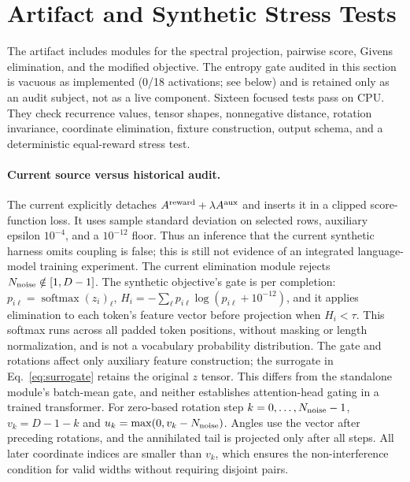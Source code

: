 \documentclass{article}
\begin{document}
\section{Artifact and Synthetic Stress Tests}
\label{sec:artifact}

The artifact includes modules for the spectral projection, pairwise score,
Givens elimination, and the modified objective. The entropy gate audited
in this section is vacuous as implemented (0/18 activations; see below)
and is retained only as an audit subject, not as a live component.
Sixteen focused tests pass on
CPU.  They check recurrence values, tensor shapes, nonnegative distance,
rotation invariance, coordinate elimination, fixture construction, output
schema, and a deterministic equal-reward stress test.

\paragraph{Current source versus historical audit.}
The current  explicitly
detaches $A^{\rm reward}+\lambda A^{\rm aux}$ and inserts it in a clipped
score-function loss. It uses sample standard deviation on selected rows,
auxiliary epsilon $10^{-4}$, and a $10^{-12}$ floor. Thus an inference
that the current synthetic harness omits coupling is false; this is still
not evidence of an integrated language-model training experiment. The current
elimination module rejects $N_{\rm noise}\notin[1,D-1]$.
The synthetic objective's gate is per completion:
$p_{i\ell}=\operatorname{softmax}(z_i)_\ell$,
$H_i=-\sum_\ell p_{i\ell}\log(p_{i\ell}+10^{-12})$, and it applies
elimination to each token's feature vector before projection when $H_i<\tau$.
This softmax runs across all padded token positions, without masking or
length normalization, and is not a vocabulary probability distribution.
The gate and rotations affect only auxiliary feature construction; the
surrogate in Eq.~\eqref{eq:surrogate} retains the original $z$ tensor.
This differs from the standalone module's batch-mean gate, and neither
establishes attention-head gating in a trained transformer. For zero-based
rotation step $k=0,\ldots,N_{\rm noise}-1$, $v_k=D-1-k$ and
$u_k=\max(0,v_k-N_{\rm noise})$. Angles use the vector after preceding
rotations, and the annihilated tail is projected only after all steps.
All later coordinate indices are smaller than $v_k$, which ensures the
non-interference condition for valid widths without requiring disjoint pairs.
\end{document}
